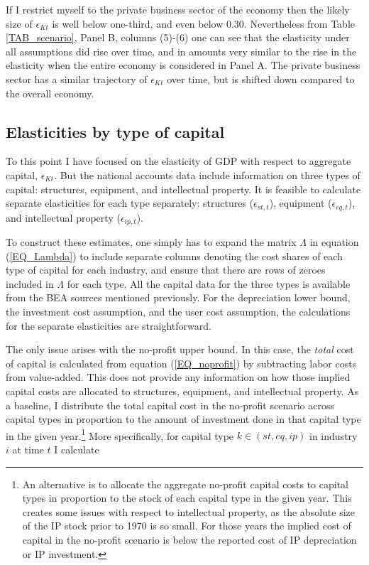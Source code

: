 \documentclass[11pt]{article}
\begin{document}
If I restrict myself to the private business sector of the economy then the likely size of $\epsilon_{Kt}$ is well below one-third, and even below 0.30. Nevertheless from Table \ref{TAB_scenario}, Panel B, columns (5)-(6) one can see that the elasticity under all assumptions did rise over time, and in amounts very similar to the rise in the elasticity when the entire economy is considered in Panel A. The private business sector has a similar trajectory of $\epsilon_{Kt}$ over time, but is shifted down compared to the overall economy.

\subsection{Elasticities by type of capital}
To this point I have focused on the elasticity of GDP with respect to aggregate capital, $\epsilon_{Kt}$. But the national accounts data include information on three types of capital: structures, equipment, and intellectual property. It is feasible to calculate separate elasticities for each type separately: structures ($\epsilon_{st,t}$), equipment ($\epsilon_{eq,t}$), and intellectual property ($\epsilon_{ip,t}$).

To construct these estimates, one simply has to expand the matrix $\Lambda$ in equation (\ref{EQ_Lambda}) to include separate columns denoting the cost shares of each type of capital for each industry, and ensure that there are rows of zeroes included in $\Lambda$ for each type. All the capital data for the three types is available from the BEA sources mentioned previously. For the depreciation lower bound, the investment cost assumption, and the user cost assumption, the calculations for the separate elasticities are straightforward. 

The only issue arises with the no-profit upper bound. In this case, the \textit{total} cost of capital is calculated from equation (\ref{EQ_noprofit}) by subtracting labor costs from value-added. This does not provide any information on how those implied capital costs are allocated to structures, equipment, and intellectual property. As a baseline, I distribute the total capital cost in the no-profit scenario across capital types in proportion to the amount of investment done in that capital type in the given year.\footnote{An alternative is to allocate the aggregate no-profit capital costs to capital types in proportion to the stock of each capital type in the given year. This creates some issues with respect to intellectual property, as the absolute size of the IP stock prior to 1970 is so small. For those years the implied cost of capital in the no-profit scenario is below the reported cost of IP depreciation or IP investment.} More specifically, for capital type $k \in (st,eq,ip)$ in industry $i$ at time $t$ I calculate
\end{document}
